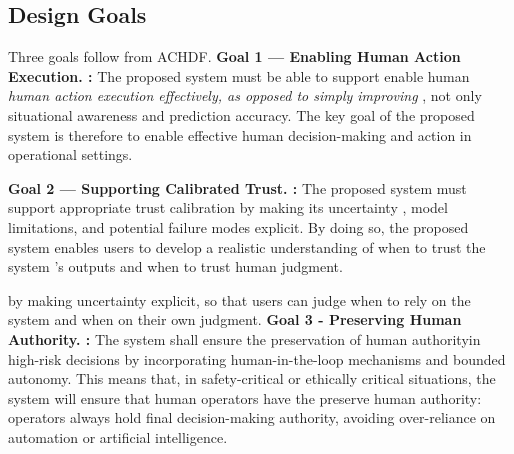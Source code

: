 \documentclass[journal]{IEEEtran}
\theoremstyle{plain}
\theoremstyle{definition}
\providecommand{\DIFaddtex}[1]{{\protect\color{blue} \sf #1}} %
\providecommand{\DIFdeltex}[1]{{\protect\color{red} \scriptsize #1}} %
\providecommand{\DIFaddbegin}{} %
\providecommand{\DIFaddend}{} %
\providecommand{\DIFdelbegin}{} %
\providecommand{\DIFdelend}{} %
\providecommand{\DIFadd}[1]{\texorpdfstring{\DIFaddtex{#1}}{#1}} %
\providecommand{\DIFdel}[1]{\texorpdfstring{\DIFdeltex{#1}}{}} %
\newcommand{\DIFscaledelfig}{0.5}
\newlength{\DIFdelgraphicswidth} %
\newlength{\DIFdelgraphicsheight} %
\newcommand{\DIFaddincludegraphics}[2][]{{\color{blue}\fbox{\DIFOincludegraphics[#1]{#2}}}} %
\newcommand{\DIFdelincludegraphics}[2][]{%
\sbox{\DIFdelgraphicsbox}{\DIFOincludegraphics[#1]{#2}}%
\settoboxwidth{\DIFdelgraphicswidth}{\DIFdelgraphicsbox} %
\settoboxtotalheight{\DIFdelgraphicsheight}{\DIFdelgraphicsbox} %
\scalebox{\DIFscaledelfig}{%
\parbox[b]{\DIFdelgraphicswidth}{\usebox{\DIFdelgraphicsbox}\\[-\baselineskip] \rule{\DIFdelgraphicswidth}{0em}}\llap{\resizebox{\DIFdelgraphicswidth}{\DIFdelgraphicsheight}{%
\setlength{\unitlength}{\DIFdelgraphicswidth}%
\begin{picture}(1,1)%
\thicklines\linethickness{2pt} %
{\color[rgb]{1,0,0}\put(0,0){\framebox(1,1){}}}%
{\color[rgb]{1,0,0}\put(0,0){\line( 1,1){1}}}%
{\color[rgb]{1,0,0}\put(0,1){\line(1,-1){1}}}%
\end{picture}%
}\hspace*{3pt}}} %
} %
\DeclareRobustCommand{\DIFaddbegin}{\DIFOaddbegin \let\includegraphics\DIFaddincludegraphics} %
\DeclareRobustCommand{\DIFaddend}{\DIFOaddend \let\includegraphics\DIFOincludegraphics} %
\DeclareRobustCommand{\DIFdelbegin}{\DIFOdelbegin \let\includegraphics\DIFdelincludegraphics} %
\DeclareRobustCommand{\DIFdelend}{\DIFOaddend \let\includegraphics\DIFOincludegraphics} %
\begin{document}
    \subsection{\DIFadd{Design Goals}}
    \DIFadd{Three goals follow from ACHDF. }\DIFaddend \textbf{Goal 1\DIFdelbegin \DIFdel{— Enabling Human Action Execution.}\DIFdelend \DIFaddbegin \DIFadd{:}\DIFaddend } \DIFdelbegin \DIFdel{The proposed system must be able to support }\DIFdelend \DIFaddbegin \DIFadd{enable human }\DIFaddend \emph{\DIFdelbegin \DIFdel{human }\DIFdelend action execution\DIFdelbegin %
\DIFdel{effectively, as opposed to simply improving }\DIFdelend \DIFaddbegin }\DIFadd{, not only }\DIFaddend situational awareness and prediction accuracy. \DIFdelbegin \DIFdel{The key goal of the proposed system is therefore to enable effective human decision-making and action in operational settings.
}%

\DIFdelend \textbf{Goal 2\DIFdelbegin \DIFdel{— Supporting Calibrated Trust.}\DIFdelend \DIFaddbegin \DIFadd{:}\DIFaddend } \DIFdelbegin \DIFdel{The proposed system must }\DIFdelend support appropriate trust \DIFdelbegin \DIFdel{calibration by making its uncertainty , model limitations, and potential failure modes explicit. By doing so, the proposed system enables users to develop a realistic understanding of when to trust the system 's outputs and when to trust human judgment. }%

\DIFdelend \DIFaddbegin \DIFadd{\cite{Lee2004} by making uncertainty explicit, so that users can judge when to rely on the system and when on their own judgment. }\DIFaddend \textbf{Goal 3\DIFdelbegin \DIFdel{- Preserving Human Authority.}\DIFdelend \DIFaddbegin \DIFadd{:}\DIFaddend } \DIFdelbegin \DIFdel{The system shall ensure the preservation of human authorityin high-risk decisions by incorporating human-in-the-loop mechanisms and bounded autonomy. This means that, in safety-critical or ethically critical situations, the system will ensure that human operators have the }\DIFdelend \DIFaddbegin \DIFadd{preserve human authority: operators always hold }\DIFaddend final decision-making \DIFdelbegin \DIFdel{authority, avoiding over-reliance on automation or artificial intelligence. }%
\end{document}
